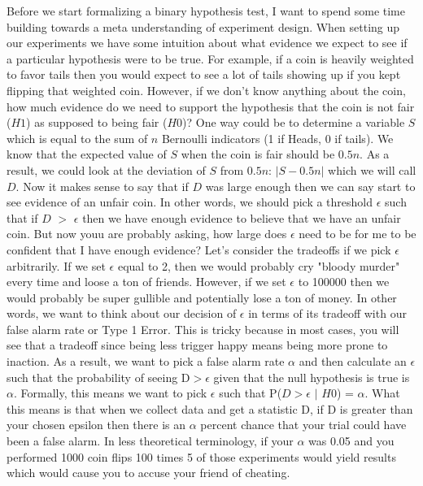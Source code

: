 Before we start formalizing a binary hypothesis test, I want to spend some time building 
towards a meta understanding of experiment design. When setting up our experiments we have 
some intuition about what evidence we expect to see if a particular hypothesis were to be 
true. For example, if a coin is heavily weighted to favor tails then you would expect to see 
a lot of tails showing up if you kept flipping that weighted coin. 
However, if we don’t know anything about the coin, how much evidence do we need to support 
the hypothesis that the coin is not fair (\(H1\)) as supposed to being fair (\(H0\))? 
One way could be to determine a variable \(S\) which is equal to the sum of \(n\) Bernoulli 
indicators (1 if Heads, 0 if tails). We know that the expected value of \(S\) when the coin is fair should be \(0.5n\).
As a result, we could look at the deviation of \(S\) from \(0.5n\): \(|S-0.5n|\) which we will call \(D\). 
Now it makes sense to say that if \(D\) was large enough then we can say start to see evidence of an unfair coin. 
In other words, we should pick a threshold $\epsilon$ such that if \(D\) $>$ $\epsilon$ then we have enough evidence to believe
that we have an unfair coin. But now youu are probably asking, how large does $\epsilon$ need to be for me
to be confident that I have enough evidence? Let's consider the tradeoffs if we pick $\epsilon$ arbitrarily. 
If we set $\epsilon$ equal to 2, then we would probably cry "bloody murder" every time and loose a ton of 
friends. However, if we set $\epsilon$ to 100000 then we would probably be super gullible and
potentially lose a ton of money. In other words, we want to think about our decision of $\epsilon$ in terms
of its tradeoff with our false alarm rate or Type 1 Error. This is tricky because in most cases, you will see
that a tradeoff since being less trigger happy means being more prone to inaction. As a result, we want to pick
a false alarm rate $\alpha$ and then calculate an $\epsilon$ such that the probability of seeing D$>$$\epsilon$ 
given that the null hypothesis is true is $\alpha$. Formally, this means we want to pick $\epsilon$ such that 
P(\(D\)$>$$\epsilon$ $|$ \(H0\)) = $\alpha$. What this means is that when we collect data and get a statistic D, 
if D is greater than your chosen epsilon then there is an $\alpha$ percent chance that your trial could have been 
a false alarm. In less theoretical terminology, if your $\alpha$ was 0.05 and you performed 1000 coin flips 100 times
5 of those experiments would yield results which would cause you to accuse your friend of cheating.

